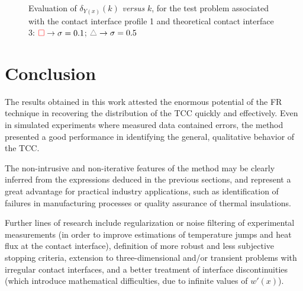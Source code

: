 \documentclass[12pt]{CHT-20}
\begin{document}
\begin{figure}[H]
	\begin{center}		
		\caption{Evaluation of $\delta_{Y(x)}(k)$ \textit{versus} $k$, for the test problem associated with the contact interface profile 1 and theoretical contact interface 3: $\textcolor{red}{\square} \rightarrow \sigma = 0.1$; $\textcolor{gray}{\triangle} \rightarrow \sigma = 0.5$}
		\label{erro_rms_xxx}
	\end{center}
\end{figure}

\section*{Conclusion}

The results obtained in this work attested the enormous potential of the FR technique in recovering the distribution of the TCC quickly and effectively. Even in simulated experiments where measured data contained errors, the method presented a good performance in identifying the general, qualitative behavior of the TCC.

The non-intrusive and non-iterative features of the method may be clearly inferred from the expressions deduced in the previous sections, and represent a great advantage for practical industry applications, such as identification of failures in manufacturing processes or quality assurance of thermal insulations.

Further lines of research include regularization or noise filtering of experimental measurements (in order to improve estimations of temperature jumps and heat flux at the contact interface), definition of more robust and less subjective stopping criteria, extension to three-dimensional and/or transient problems with irregular contact interfaces, and a better treatment of interface discontinuities (which introduce mathematical difficulties, due to infinite values of $w'(x)$).
\end{document}
